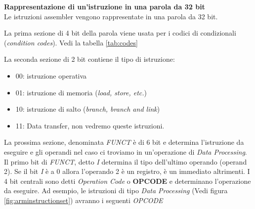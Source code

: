 \begin{defn}
    \textbf{Rappresentazione di un'istruzione in una parola da 32 bit} \\
    Le istruzioni assembler vengono rappresentate in una parola da 32 bit.

    La prima sezione di 4 bit della parola viene usata per i codici di condizionali (\textit{condition codes}).
    Vedi la tabella \ref{tab:codes}

    La seconda sezione di 2 bit contiene il tipo di istruzione:
    \begin{itemize}
        \item 00: istruzione operativa
        \item 01: istruzione di memoria (\textit{load, store, etc.})
        \item 10: istruzione di salto (\textit{branch, branch and link})
        \item 11: Data transfer, non vedremo queste istruzioni.
    \end{itemize}

    La prossima sezione, denominata \textit{FUNCT} è di 6 bit e determina l'istruzione da eseguire e gli operandi nel caso ci troviamo in un'operazione di \textit{Data Processing}.
    Il primo bit di \textit{FUNCT}, detto \textit{I} determina il tipo dell'ultimo operando (operand 2).
    Se il bit \textit{I} è a 0 allora l'operando 2 è un registro, è un immediato altrimenti.
    I 4 bit centrali sono detti \textit{Operation Code} o \textbf{OPCODE} e determinano l'operazione da eseguire.
    Ad esempio, le istruzioni di tipo \textit{Data Processing} (Vedi figura \ref{fig:arminstructionset}) avranno i seguenti \textit{OPCODE}


\end{defn}
